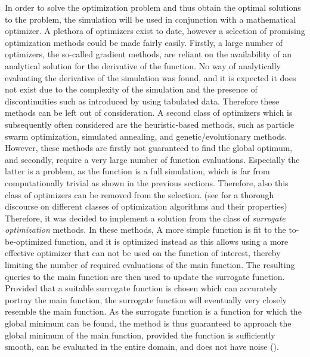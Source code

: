 In order to solve the optimization problem and thus obtain the optimal solutions to the problem, the simulation will be used in conjunction with a mathematical optimizer. A plethora of optimizers exist to date, however a selection of promising optimization methods could be made fairly easily. Firstly, a large number of optimizers, the so-called gradient methods, are reliant on the availability of an analytical solution for the derivative of the function. No way of analytically evaluating the derivative of the simulation was found, and it is expected it does not exist due to the complexity of the simulation and the presence of discontinuities such as introduced by using tabulated data. Therefore these methods can be left out of consideration. A second class of optimizers which is subsequently often considered are the heuristic-based methods, such as particle swarm optimization, simulated annealing, and genetic/evolutionary methods. However, these methods are firstly not guaranteed to find the global optimum, and secondly, require a very large number of function evaluations. Especially the latter is a problem, as the function is a full simulation, which is far from computationally trivial as shown in the previous sections. Therefore, also this class of optimizers can be removed from the selection. (see \cite{OptimizationAlgorithms} for a thorough discourse on different classes of optimization algorithms and their properties)\\

Therefore, it was decided to implement a solution from the class of \textit{surrogate optimization} methods. In these methods, A more simple function is fit to the to-be-optimized function, and it is optimized instead as this allows using a more effective optimizer that can not be used on the function of interest, thereby limiting the number of required evaluations of the main function. The resulting queries to the main function are then used to update the surrogate function. Provided that a suitable surrogate function is chosen which can accurately portray the main function, the surrogate function will eventually very closely resemble the main function. As the surrogate function is a function for which the global minimum can be found, the method is thus guaranteed to approach the global minimum of the main function, provided the function is sufficiently smooth, can be evaluated in the entire domain, and does not have noise (\cite{Surrogate}). \\


